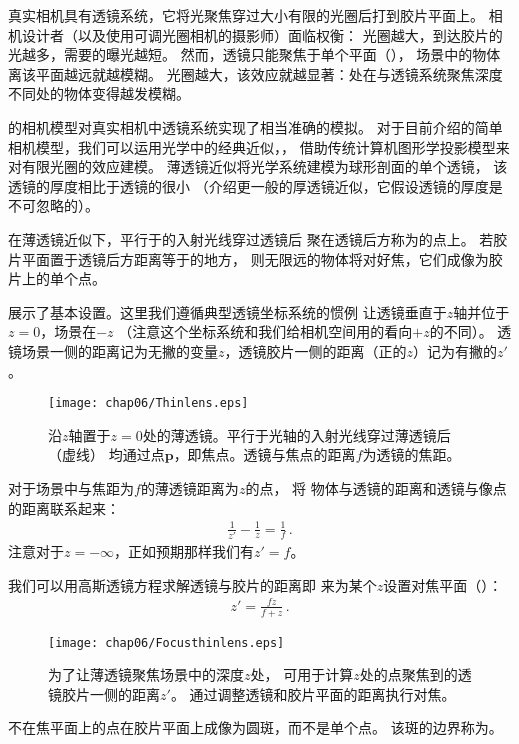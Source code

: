 真实相机具有透镜系统，它将光聚焦穿过大小有限的光圈后打到胶片平面上。
相机设计者（以及使用可调光圈相机的摄影师）面临权衡：
光圈越大，到达胶片的光越多，需要的曝光越短。
然而，透镜只能聚焦于单个平面（），
场景中的物体离该平面越远就越模糊。
光圈越大，该效应就越显著：处在与透镜系统聚焦深度不同处的物体变得越发模糊。

的相机模型对真实相机中透镜系统实现了相当准确的模拟。
对于目前介绍的简单相机模型，我们可以运用光学中的经典近似，，
借助传统计算机图形学投影模型来对有限光圈的效应建模。
薄透镜近似将光学系统建模为球形剖面的单个透镜，
该透镜的厚度相比于透镜的很小
（介绍更一般的厚透镜近似，它假设透镜的厚度是不可忽略的）。

在薄透镜近似下，平行于的入射光线穿过透镜后
聚在透镜后方称为的点上。
若胶片平面置于透镜后方距离等于的地方，
则无限远的物体将对好焦，它们成像为胶片上的单个点。

展示了基本设置。这里我们遵循典型透镜坐标系统的惯例
让透镜垂直于$z$轴并位于$z=0$，场景在$-z$
（注意这个坐标系统和我们给相机空间用的看向$+z$的不同）。
透镜场景一侧的距离记为无撇的变量$z$，透镜胶片一侧的距离（正的$z$）记为有撇的$z'$。
\begin{figure}[htbp]
    \centering\texttt{[image: chap06/Thinlens.eps]}
    \caption{沿$z$轴置于$z=0$处的薄透镜。平行于光轴的入射光线穿过薄透镜后（虚线）
        均通过点$\bm p$，即焦点。透镜与焦点的距离$f$为透镜的焦距。}
    \label{fig:6.6}
\end{figure}

对于场景中与焦距为$f$的薄透镜距离为$z$的点，
将
物体与透镜的距离和透镜与像点的距离联系起来：
\begin{align}\label{eq:6.1}
    \frac{1}{z'}-\frac{1}{z}=\frac{1}{f}\, .
\end{align}
注意对于$z=-\infty$，正如预期那样我们有$z'=f$。

我们可以用高斯透镜方程求解透镜与胶片的距离即
来为某个$z$设置对焦平面（）：
\begin{align}\label{eq:6.2}
    z'=\frac{fz}{f+z}\, .
\end{align}

\begin{figure}[htbp]
    \centering\texttt{[image: chap06/Focusthinlens.eps]}
    \caption{为了让薄透镜聚焦场景中的深度$z$处，
        可用于计算$z$处的点聚焦到的透镜胶片一侧的距离$z'$。
        通过调整透镜和胶片平面的距离执行对焦。}
    \label{fig:6.7}
\end{figure}

不在焦平面上的点在胶片平面上成像为圆斑，而不是单个点。
该斑的边界称为。
